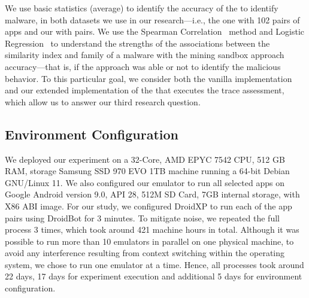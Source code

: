 We use basic statistics (average) to identify the
accuracy of the \mas to identify malware, in both
datasets we use in our research---i.e., the \sds
one with 102 pairs of apps and our \cds with
\apps pairs. We use the Spearman Correlation~\cite{spearman-correlation} method and
Logistic Regression~\cite{statistical-learning} to understand the strengths of
the associations between the similarity index and family of a
malware with the mining sandbox approach accuracy---that is,
if the approach was able or not to identify the malicious behavior.
To this particular goal, we consider
both the vanilla implementation and our extended implementation
of the \mas that executes the trace assessment, which allow us
to answer our third research question. 


\subsection{Environment Configuration}\label{sec:hardware}


We deployed our experiment on a 32-Core, AMD EPYC 7542 CPU, 512 GB RAM, storage Samsung SSD 970 EVO 1TB machine running a 64-bit Debian  GNU/Linux 11. We also configured our emulator to run all selected apps on Google Android version 9.0, API 28, 512M SD Card, 7GB internal storage, with X86 ABI image.
For our study, we configured DroidXP to run each of the \apps app pairs using DroidBot for 3 minutes. To mitigate noise, we repeated the full process 3 times,  which took around 421 machine hours in total. Although it was possible to run more than 10 emulators in parallel on one physical machine, to avoid any interference resulting from context switching within the operating system, we chose to run one emulator at a time.  Hence, all processes took around 22 days, 17 days for experiment execution and additional 5 days for environment configuration.

